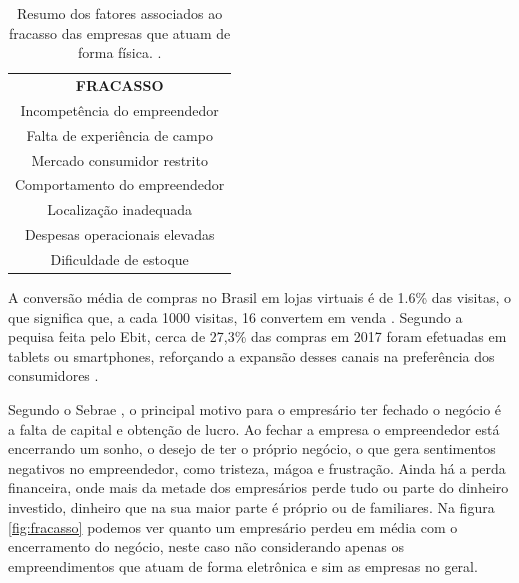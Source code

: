 \begin{table}[H]
 \centering
 {\renewcommand\arraystretch{1.25}
 
  \caption{Resumo dos fatores associados ao fracasso das empresas que atuam de forma física. \cite{idalbertochiavenato2007}. }
 \label{tab:fracassofisica}
 
 \begin{tabular}{ l }
  \cline{1-1}  
    \multicolumn{1}{|c|}{\textbf{FRACASSO} \centering }
  \\  
  \cline{1-1}  
    \multicolumn{1}{|c|}{Incompetência do empreendedor \centering }
  \\  
  \cline{1-1}  
    \multicolumn{1}{|c|}{Falta de experiência de campo \centering }
  \\  
  \cline{1-1}  
    \multicolumn{1}{|c|}{Mercado consumidor restrito \centering }
  \\  
  \cline{1-1}  
    \multicolumn{1}{|c|}{Comportamento do empreendedor \centering }
  \\  
  \cline{1-1}  
    \multicolumn{1}{|c|}{Localização inadequada \centering }
  \\  
  \cline{1-1}  
    \multicolumn{1}{|c|}{Despesas operacionais elevadas \centering }
  \\  
  \cline{1-1}  
    \multicolumn{1}{|c|}{Dificuldade de estoque \centering }
  \\  
  \hline

 \end{tabular} }
\end{table}

A conversão média de compras no Brasil em lojas virtuais é de 1.6\% das visitas, o que significa que, a cada 1000 visitas, 16 convertem em venda \cite{sebrae2019}. Segundo a pequisa feita pelo Ebit, cerca de 27,3\% das compras em 2017 foram efetuadas em tablets ou smartphones, reforçando a expansão desses canais na preferência dos consumidores \cite{ecombrasil2018}.

Segundo o Sebrae \cite{sebraesp}, o principal motivo para o empresário ter fechado o negócio é a falta de capital e obtenção de lucro. Ao fechar a empresa o empreendedor está encerrando um sonho, o desejo de ter o próprio negócio, o que gera sentimentos negativos no empreendedor, como tristeza, mágoa e frustração. Ainda há a perda financeira, onde mais da metade dos empresários perde tudo ou parte do dinheiro investido, dinheiro que na sua maior parte é próprio ou de familiares. Na figura \ref{fig:fracasso} podemos ver quanto um empresário perdeu em média com o encerramento do negócio, neste caso não considerando apenas os empreendimentos que atuam de forma eletrônica e sim as empresas no geral.

